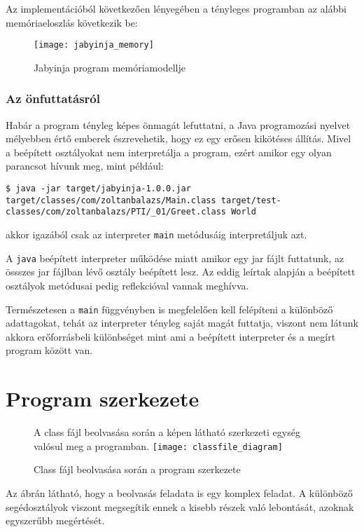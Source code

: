 Az implementációból következően lényegében a tényleges programban az alábbi memóriaeloszlás következik be:

\begin{figure}[H]
	\centering
	\texttt{[image: jabyinja\_memory]}
	\caption{Jabyinja program memóriamodellje}
	\label{fig:memory}
\end{figure}

\subsubsection{Az önfuttatásról}

Habár a program tényleg képes önmagát lefuttatni, a Java programozási nyelvet mélyebben értő emberek észrevehetik, hogy ez egy erősen kikötéses állítás. Mivel a beépített osztályokat nem interpretálja a program, ezért amikor egy olyan parancsot hívunk meg, mint például: 
\begin{verbatim}
$ java -jar target/jabyinja-1.0.0.jar target/classes/com/zoltanbalazs/Main.class target/test-classes/com/zoltanbalazs/PTI/_01/Greet.class World
\end{verbatim}
akkor igazából csak az interpreter \lstinline{main} metódusáig interpretáljuk azt.

A \lstinline{java} beépített interpreter működése miatt amikor egy jar fájlt futtatunk, az össszes jar fájlban lévő osztály beépített lesz. Az eddig leírtak alapján a beépített osztályok metódusai pedig reflekcióval vannak meghívva.

Természetesen a \lstinline{main} függvényben is megfelelően kell felépíteni a különböző adattagokat, tehát az interpreter tényleg saját magát futtatja, viszont nem látunk akkora erőforrásbeli különbséget mint ami a beépített interpreter és a megírt program között van.

\section{Program szerkezete}

\begin{figure}[H]
	A class fájl beolvasása során a képen látható szerkezeti egység valósul meg a programban. 
	\centering
	\texttt{[image: classfile\_diagram]}
	\caption{Class fájl beolvasása során a program szerkezete}
	\label{fig:classfile_parse}
\end{figure}

Az ábrán látható, hogy a beolvasás feladata is egy komplex feladat. A különböző segédosztályok viszont megsegítik ennek a kisebb részek való lebontását, azoknak egyszerűbb megértését.

